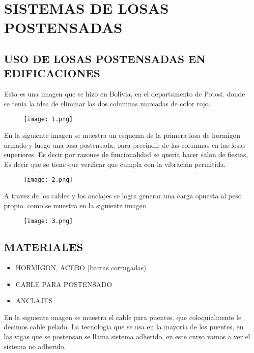 \color{white}
\pagecolor{black_background}

\tableofcontents
\newpage

\chapter{SISTEMAS DE LOSAS POSTENSADAS}
\newpage

\section{USO DE LOSAS POSTENSADAS EN EDIFICACIONES}

Esta es una imagen que se hizo en Bolivia, en el departamento de
Potosi. donde se tenia la idea de eliminar las dos columnas marcadas
de color rojo.

\begin{figure}[H]
\centering
\texttt{[image: 1.png]}
\end{figure}

En la siguiente imagen se muestra un esquema de la primera losa 
de hormigon armado y luego una losa postensada, para precindir 
de las columnas en las losas superiores. Es decir por razones
de funcionalidad se queria hacer salon de fiestas, Es decir que
se tiene que verificar que cumpla con la vibración permitida.

\begin{figure}[H]
\centering
\texttt{[image: 2.png]}
\end{figure}

A travez de los cables y los anclajes se logra generar una carga
opuesta al peso propio. como se muestra en la siguiente imagen

\begin{figure}[H]
\centering
\texttt{[image: 3.png]}
\end{figure}

\section{MATERIALES}

\begin{itemize}
	\item HORMIGON, ACERO (barras corrugadas)
	\item CABLE PARA POSTENSADO
	\item ANCLAJES
\end{itemize}

En la siguiente imagen se muestra el cable para puentes, que coloquialmente
le decimos cable pelado. La tecnologia que se usa en la mayoria de los puentes,
en las vigas que se postensan se llama \textquotedbl sistema adherido\textquotedbl,
en este curso vamos a ver el \textquotedbl sistema no adherido\textquotedbl.

